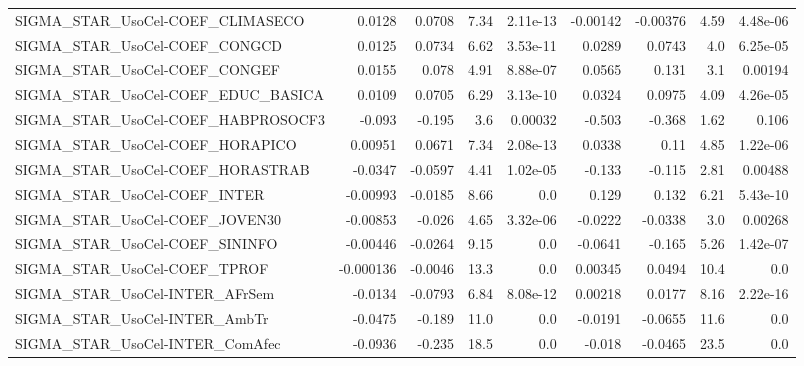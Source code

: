\begin{tabular}{lrrrrrrrr}
SIGMA\_STAR\_UsoCel-COEF\_CLIMASECO       &      0.0128 &       0.0708 &     7.34 & 2.11e-13 &   -0.00142 &    -0.00376 &         4.59 &      4.48e-06 \\
SIGMA\_STAR\_UsoCel-COEF\_CONGCD          &      0.0125 &       0.0734 &     6.62 & 3.53e-11 &     0.0289 &      0.0743 &          4.0 &      6.25e-05 \\
SIGMA\_STAR\_UsoCel-COEF\_CONGEF          &      0.0155 &        0.078 &     4.91 & 8.88e-07 &     0.0565 &       0.131 &          3.1 &       0.00194 \\
SIGMA\_STAR\_UsoCel-COEF\_EDUC\_BASICA     &      0.0109 &       0.0705 &     6.29 & 3.13e-10 &     0.0324 &      0.0975 &         4.09 &      4.26e-05 \\
SIGMA\_STAR\_UsoCel-COEF\_HABPROSOCF3     &      -0.093 &       -0.195 &      3.6 &  0.00032 &     -0.503 &      -0.368 &         1.62 &         0.106 \\
SIGMA\_STAR\_UsoCel-COEF\_HORAPICO        &     0.00951 &       0.0671 &     7.34 & 2.08e-13 &     0.0338 &        0.11 &         4.85 &      1.22e-06 \\
SIGMA\_STAR\_UsoCel-COEF\_HORASTRAB       &     -0.0347 &      -0.0597 &     4.41 & 1.02e-05 &     -0.133 &      -0.115 &         2.81 &       0.00488 \\
SIGMA\_STAR\_UsoCel-COEF\_INTER           &    -0.00993 &      -0.0185 &     8.66 &      0.0 &      0.129 &       0.132 &         6.21 &      5.43e-10 \\
SIGMA\_STAR\_UsoCel-COEF\_JOVEN30         &    -0.00853 &       -0.026 &     4.65 & 3.32e-06 &    -0.0222 &     -0.0338 &          3.0 &       0.00268 \\
SIGMA\_STAR\_UsoCel-COEF\_SININFO         &    -0.00446 &      -0.0264 &     9.15 &      0.0 &    -0.0641 &      -0.165 &         5.26 &      1.42e-07 \\
SIGMA\_STAR\_UsoCel-COEF\_TPROF           &   -0.000136 &      -0.0046 &     13.3 &      0.0 &    0.00345 &      0.0494 &         10.4 &           0.0 \\
SIGMA\_STAR\_UsoCel-INTER\_AFrSem         &     -0.0134 &      -0.0793 &     6.84 & 8.08e-12 &    0.00218 &      0.0177 &         8.16 &      2.22e-16 \\
SIGMA\_STAR\_UsoCel-INTER\_AmbTr          &     -0.0475 &       -0.189 &     11.0 &      0.0 &    -0.0191 &     -0.0655 &         11.6 &           0.0 \\
SIGMA\_STAR\_UsoCel-INTER\_ComAfec        &     -0.0936 &       -0.235 &     18.5 &      0.0 &     -0.018 &     -0.0465 &         23.5 &           0.0 \\

\end{tabular}

